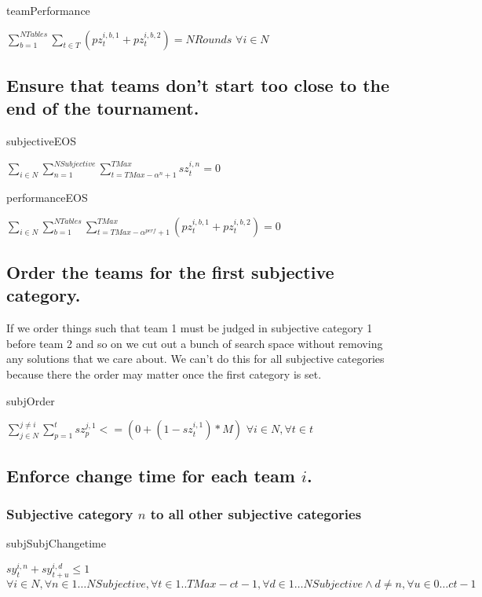 \documentclass[letterpaper,11pt]{report}
\begin{document}
\begin{algorithm}
\caption{teamPerformance}
$\sum\limits_{b=1}^{NTables} \sum\limits_{t \in T} ( pz_{t}^{i,b,1} + pz_{t}^{i,b,2} ) = NRounds$
\hfill $\forall i \in N$
\end{algorithm}

\FloatBarrier
\subsection{Ensure that teams don't start too close to the end of the
  tournament.}
\begin{algorithm}
\caption{subjectiveEOS}
$\sum\limits_{i \in N}\sum\limits_{n=1}^{NSubjective}\sum\limits_{t=TMax-\alpha^{n}+1}^{TMax} sz_{t}^{i,n} = 0$
\end{algorithm}

\begin{algorithm}
\caption{performanceEOS}
$\sum\limits_{i \in
  N}\sum\limits_{b=1}^{NTables}\sum\limits_{t=TMax-\alpha^{perf}+1}^{TMax}
  ( pz_{t}^{i,b,1} + pz_{t}^{i,b,2} ) = 0$
\end{algorithm}

\FloatBarrier
\subsection{Order the teams for the first subjective category.}
If we order things such that team 1 must be judged in subjective category 1
before team 2 and so on we cut out a bunch of search space without removing
any solutions that we care about. We can't do this for all subjective
categories because there the order may matter once the first category is
set.
\begin{algorithm}
\caption{subjOrder}
$\sum\limits_{j \in N}^{j \ne i} \sum\limits_{p=1}^{t} sz_{p}^{j,1} <= 
( 0 + ( 1 - sz_{t}^{i,1} ) * M )$
\hfill $\forall i \in N, 
\forall t \in t$
\end{algorithm}

\FloatBarrier
\subsection{Enforce change time for each team $i$.}

\subsubsection{Subjective category $n$ to all other subjective categories}
\begin{algorithm}
\caption{subjSubjChangetime}
$sy_{t}^{i,n} + sy_{t+u}^{i,d} \le 1$
\hfill $\forall i \in N,
\forall n \in 1 \dots NSubjective, 
\forall t \in 1..{TMax- ct-1},
\forall d \in 1 \dots NSubjective \wedge d \neq n,
\forall u \in 0 \dots ct-1$
\end{algorithm}
\end{document}
